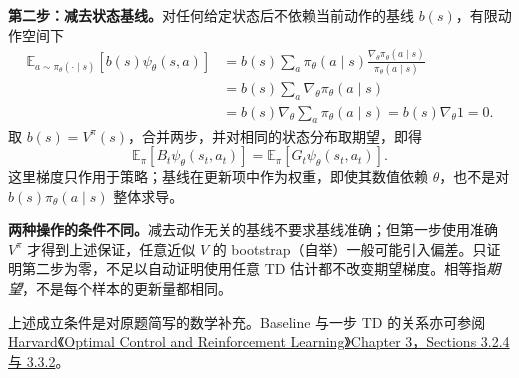 \begin{checkedsolution}
\textbf{第二步：减去状态基线。}对任何给定状态后不依赖当前动作的基线 $b(s)$，有限动作空间下
\[
\begin{aligned}
 \mathbb E_{a\sim\pi_\theta(\cdot\mid s)}[b(s)\psi_\theta(s,a)]
 &=b(s)\sum_a\pi_\theta(a\mid s)
       \frac{\nabla_\theta\pi_\theta(a\mid s)}{\pi_\theta(a\mid s)}\\
 &=b(s)\sum_a\nabla_\theta\pi_\theta(a\mid s)\\
 &=b(s)\nabla_\theta\sum_a\pi_\theta(a\mid s)
 =b(s)\nabla_\theta1=0.
\end{aligned}
\]
取 $b(s)=V^\pi(s)$，合并两步，并对相同的状态分布取期望，即得
\[
 \boxed{\mathbb E_\pi[B_t\psi_\theta(s_t,a_t)]
       =\mathbb E_\pi[G_t\psi_\theta(s_t,a_t)]}.
\]
这里梯度只作用于策略；基线在更新项中作为权重，即使其数值依赖 $\theta$，也不是对 $b(s)\pi_\theta(a\mid s)$ 整体求导。

\textbf{两种操作的条件不同。}减去动作无关的基线不要求基线准确；但第一步使用准确 $V^\pi$ 才得到上述保证，任意近似 $V$ 的 bootstrap（自举）一般可能引入偏差。只证明第二步为零，不足以自动证明使用任意 TD 估计都不改变期望梯度。相等指\emph{期望}，不是每个样本的更新量都相同。

上述成立条件是对原题简写的数学补充。Baseline 与一步 TD 的关系亦可参阅\href{https://hankyang.seas.harvard.edu/OptimalControlReinforcementLearning/policy-gradient.html}{Harvard《Optimal Control and Reinforcement Learning》Chapter 3，Sections 3.2.4 与 3.3.2}。
\end{checkedsolution}
